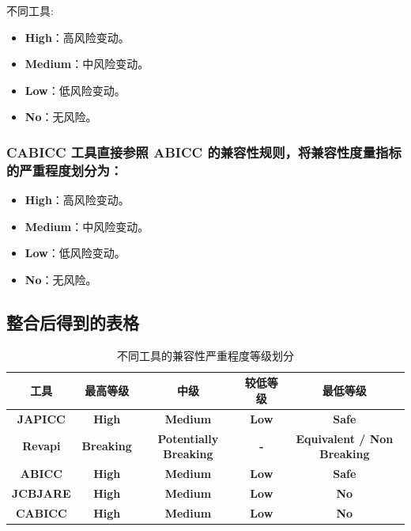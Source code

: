 \documentclass[14pt,a4paper,UTF8,twoside]{article}
\renewenvironment{proof}[1][不同工具:]{\ProofBox\strut\textsc{#1}\space}{\endProofBox}
\begin{document}
\begin{proof}{}{}
\begin{itemize}
    \item \textbf{High}：高风险变动。  
    \item \textbf{Medium}：中风险变动。  
    \item \textbf{Low}：低风险变动。  
    \item \textbf{No}：无风险。  
\end{itemize}

\subsubsection*{CABICC 工具直接参照 ABICC 的兼容性规则，将兼容性度量指标的严重程度划分为：}

\begin{itemize}
    \item \textbf{High}：高风险变动。  
    \item \textbf{Medium}：中风险变动。  
    \item \textbf{Low}：低风险变动。  
    \item \textbf{No}：无风险。  
\end{itemize}

\end{proof}

\subsection{整合后得到的表格}

\renewcommand{\arraystretch}{1.3}
\noindent
\begin{table}[ht]
\centering
\begin{tabular}{|>{\bfseries}c|>{\bfseries}c|>{\bfseries}c|>{\bfseries}c|>{\bfseries}c|}
    \hline
    \textbf{工具}       & \textbf{最高等级}                   & \textbf{中级}                & \textbf{较低等级}                 & \textbf{最低等级} \\ \hline
    \textbf{JAPICC}     & High                            & Medium                         & Low                          & Safe        \\ \hline
    \textbf{Revapi}     & Breaking                        & Potentially Breaking           & -                            & Equivalent / Non Breaking \\ \hline
    \textbf{ABICC}      & High                            & Medium                         & Low                          & Safe        \\ \hline
    \textbf{JCBJARE}    & High                            & Medium                         & Low                          & No          \\ \hline
    \textbf{CABICC}     & High                            & Medium                         & Low                          & No          \\ \hline
\end{tabular}
\caption{不同工具的兼容性严重程度等级划分}
\label{tab:compatibility_levels}
\end{table}
\end{document}
